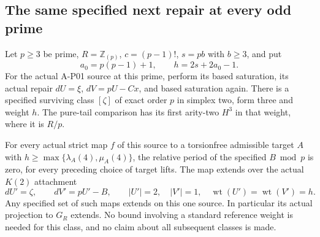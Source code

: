 \subsection{The same specified next repair at every odd prime}

\begin{theorem}
\label{AL21}
Let $p\geq3$ be prime, $R=\mathbb Z_{(p)}$, $c=(p-1)!$,
$s=pb$ with $b\geq3$, and put
\[
          a_0=p(p-1)+1,\qquad h=2s+2a_0-1.
 \tag{AL.121}
\]
For the actual A-P01 source at this prime, perform its based
saturation, its actual repair $dU=\xi$, $dV=pU-Cx$, and
based saturation again. There is a specified surviving
class $[\zeta]$ of exact order $p$ in simplex two, form
three and weight $h$. The pure-tail comparison has its
first arity-two $H^3$ in that weight, where it is $R/p$.

For every actual strict map $f$ of this source to a
torsionfree admissible target $A$ with
$h\geq\max\{\lambda_A(4),\mu_A(4)\}$, the relative period
of the specified $B\bmod p$ is zero, for every preceding
choice of target lifts. The map extends over the actual
$K(2)$ attachment
\[
            dU'=\zeta,\qquad dV'=pU'-B,
              \qquad |U'|=2,\quad |V'|=1,
              \quad\operatorname{wt}(U')=\operatorname{wt}(V')=h.
 \tag{AL.122}
\]
Any specified set of such maps extends on this one source.
In particular its actual projection to $G_R$ extends.
No bound involving a standard reference weight is needed
for this class, and no claim about all subsequent classes
is made.
\end{theorem}

